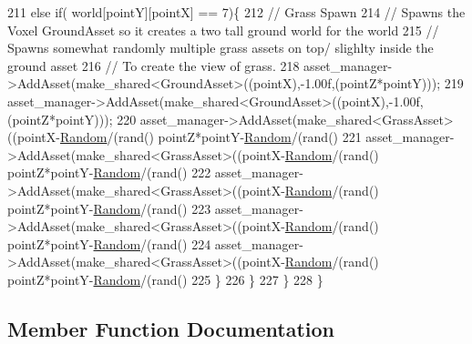 \begin{DoxyCode}
211     \textcolor{keywordflow}{else} \textcolor{keywordflow}{if}( world[pointY][pointX] == 7)\{
212             \textcolor{comment}{// Grass Spawn}
214 \textcolor{comment}{}            \textcolor{comment}{// Spawns the Voxel GroundAsset so it creates a two tall ground world for the world}
215             \textcolor{comment}{// Spawns somewhat randomly multiple grass assets on top/ slighlty inside the ground asset}
216             \textcolor{comment}{// To create the view of grass.}
218 \textcolor{comment}{}            asset\_manager->AddAsset(make\_shared<GroundAsset>((pointX),-1.00f,(pointZ*pointY)));
219             asset\_manager->AddAsset(make\_shared<GroundAsset>((pointX),-1.00f,(pointZ*pointY)));
220             asset\_manager->AddAsset(make\_shared<GrassAsset>((pointX-\hyperlink{classGameWorld_a56652cc9880b3ba1be61395066c863c3}{Random}/(rand() %
      pointZ*pointY-\hyperlink{classGameWorld_a56652cc9880b3ba1be61395066c863c3}{Random}/(rand()%
221             asset\_manager->AddAsset(make\_shared<GrassAsset>((pointX-\hyperlink{classGameWorld_a56652cc9880b3ba1be61395066c863c3}{Random}/(rand() %
      pointZ*pointY-\hyperlink{classGameWorld_a56652cc9880b3ba1be61395066c863c3}{Random}/(rand() %
222             asset\_manager->AddAsset(make\_shared<GrassAsset>((pointX-\hyperlink{classGameWorld_a56652cc9880b3ba1be61395066c863c3}{Random}/(rand() %
      pointZ*pointY-\hyperlink{classGameWorld_a56652cc9880b3ba1be61395066c863c3}{Random}/(rand() %
223             asset\_manager->AddAsset(make\_shared<GrassAsset>((pointX-\hyperlink{classGameWorld_a56652cc9880b3ba1be61395066c863c3}{Random}/(rand() %
      pointZ*pointY-\hyperlink{classGameWorld_a56652cc9880b3ba1be61395066c863c3}{Random}/(rand() %
224             asset\_manager->AddAsset(make\_shared<GrassAsset>((pointX-\hyperlink{classGameWorld_a56652cc9880b3ba1be61395066c863c3}{Random}/(rand() %
      pointZ*pointY-\hyperlink{classGameWorld_a56652cc9880b3ba1be61395066c863c3}{Random}/(rand() %
225    \}
226   \}
227  \}  
228 \}
\end{DoxyCode}


\subsection{Member Function Documentation}
\hypertarget{classGameWorld_a43080b1c693798b12f7faf28a6b45ab5}{}
